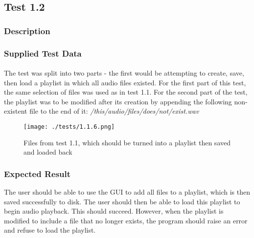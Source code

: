 \pagebreak
\subsection{Test 1.2}
\subsubsection{Description}
\paragraph{}
{
	\centering
}

\subsubsection{Supplied Test Data}
\paragraph{}
The test was split into two parts - the first would be attempting to create, save, then load a playlist in which all audio files existed. For the first part of this test, the same selection of files was used as in test 1.1. For the second part of the test, the playlist was to be modified after its creation by appending the following non-existent file to the end of it:
\textit{/this/audio/files/does/not/exist.wav}
\begin{figure}[H]
	\texttt{[image: ./tests/1.1.6.png]}
	\caption{Files from test 1.1, which should be turned into a playlist then saved and loaded back}
\end{figure}

\subsubsection{Expected Result}
The user should be able to use the GUI to add all files to a playlist, which is then saved successfully to disk. The user should then be able to load this playlist to begin audio playback. This should succeed. However, when the playlist is modified to include a file that no longer exists, the program should raise an error and refuse to load the playlist.

